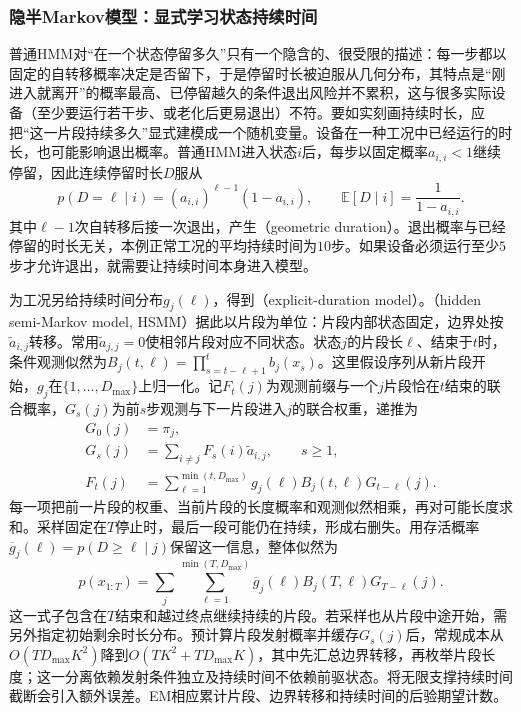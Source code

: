\subsubsection{隐半Markov模型：显式学习状态持续时间}
\label{sec:pgm-dynamic-hsmm-model}

普通HMM对“在一个状态停留多久”只有一个隐含的、很受限的描述：每一步都以固定的自转移概率决定是否留下，于是停留时长被迫服从几何分布，其特点是“刚进入就离开”的概率最高、已停留越久的条件退出风险并不累积，这与很多实际设备（至少要运行若干步、或老化后更易退出）不符。要如实刻画持续时长，应把“这一片段持续多久”显式建模成一个随机变量。设备在一种工况中已经运行的时长，也可能影响退出概率。普通HMM进入状态$i$后，每步以固定概率$a_{i,i}<1$继续停留，因此连续停留时长$D$服从
\begin{equation}
  p(D=\ell\mid i)=(a_{i,i})^{\ell-1}(1-a_{i,i}),
  \qquad
  \mathbb{E}[D\mid i]=\frac{1}{1-a_{i,i}}.
  \label{eq:pgm-dynamic-geometric-duration}
\end{equation}
其中$\ell-1$次自转移后接一次退出，产生（geometric duration）。退出概率与已经停留的时长无关，本例正常工况的平均持续时间为$10$步。如果设备必须运行至少$5$步才允许退出，就需要让持续时间本身进入模型。

为工况另给持续时间分布$g_j(\ell)$，得到（explicit-duration model）。（hidden semi-Markov model, HSMM）据此以片段为单位：片段内部状态固定，边界处按$\widetilde a_{i,j}$转移。常用$\widetilde a_{j,j}=0$使相邻片段对应不同状态。状态$j$的片段长$\ell$、结束于$t$时，条件观测似然为$B_j(t,\ell)=\prod_{s=t-\ell+1}^{t}b_j(x_s)$。这里假设序列从新片段开始，$g_j$在$\{1,\ldots,D_{\max}\}$上归一化。记$F_t(j)$为观测前缀与一个$j$片段恰在$t$结束的联合概率，$G_s(j)$为前$s$步观测与下一片段进入$j$的联合权重，递推为
\begin{equation}
  \begin{aligned}
    G_0(j)&=\pi_j,\\
    G_s(j)&=\sum_{i\ne j}
      F_s(i)\widetilde a_{i,j},\qquad s\geq1,\\
    F_t(j)&=\sum_{\ell=1}^{\min(t,D_{\max})}
      g_j(\ell)B_j(t,\ell)G_{t-\ell}(j).
  \end{aligned}
  \label{eq:pgm-dynamic-hsmm}
\end{equation}
每一项把前一片段的权重、当前片段的长度概率和观测似然相乘，再对可能长度求和。采样固定在$T$停止时，最后一段可能仍在持续，形成右删失。用存活概率$\overline g_j(\ell)=p(D\geq\ell\mid j)$保留这一信息，整体似然为
\[
  p(x_{1:T})=\sum_j\sum_{\ell=1}^{\min(T,D_{\max})}
    \overline g_j(\ell)B_j(T,\ell)G_{T-\ell}(j).
\]
这一式子包含在$T$结束和越过终点继续持续的片段。若采样也从片段中途开始，需另外指定初始剩余时长分布。预计算片段发射概率并缓存$G_s(j)$后，常规成本从$O(TD_{\max}K^2)$降到$O(TK^2+TD_{\max}K)$，其中先汇总边界转移，再枚举片段长度；这一分离依赖发射条件独立及持续时间不依赖前驱状态。将无限支撑持续时间截断会引入额外误差。EM相应累计片段、边界转移和持续时间的后验期望计数。


